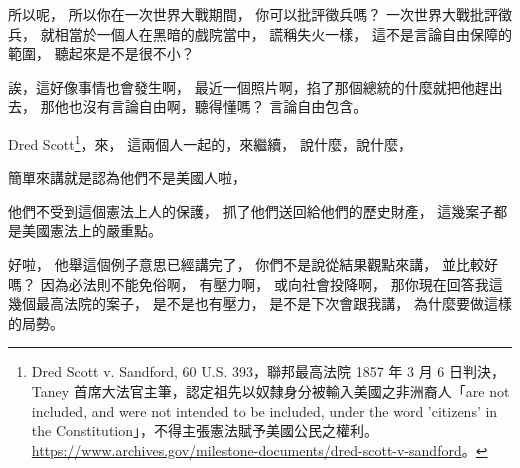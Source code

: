 \hypertarget{w06:cue:2427}{}所以呢，
\hypertarget{w06:cue:2428}{}所以你在一次世界大戰期間，
\hypertarget{w06:cue:2429}{}你可以批評徵兵嗎？
\hypertarget{w06:cue:2430}{}一次世界大戰批評徵兵，
\hypertarget{w06:cue:2431}{}就相當於一個人在黑暗的戲院當中，
\hypertarget{w06:cue:2432}{}謊稱失火一樣，
\hypertarget{w06:cue:2433}{}這不是言論自由保障的範圍，
\hypertarget{w06:cue:2434}{}聽起來是不是很不小？

\hypertarget{w06:cue:2435}{}誒，這好像事情也會發生啊，
\hypertarget{w06:cue:2436}{}最近一個照片啊，掐了那個總統的什麼就把他趕出去，
\hypertarget{w06:cue:2437}{}那他也沒有言論自由啊，聽得懂嗎？
\hypertarget{w06:cue:2438}{}言論自由包含。

\hypertarget{w06:cue:2439}{}Dred Scott\footnote{Dred Scott v. Sandford, 60 U.S. 393，聯邦最高法院 1857 年 3 月 6 日判決，Taney 首席大法官主筆，認定祖先以奴隸身分被輸入美國之非洲裔人「are not included, and were not intended to be included, under the word 'citizens' in the Constitution」，不得主張憲法賦予美國公民之權利。\url{https://www.archives.gov/milestone-documents/dred-scott-v-sandford}。}，來，
\hypertarget{w06:cue:2440}{}這兩個人一起的，來繼續，
\hypertarget{w06:cue:2441}{}說什麼，說什麼，

\hypertarget{w06:cue:2442}{}簡單來講就是認為他們不是美國人啦，

\hypertarget{w06:cue:2443}{}他們不受到這個憲法上人的保護，
\hypertarget{w06:cue:2444}{}抓了他們送回給他們的歷史財產，
\hypertarget{w06:cue:2445}{}這幾案子都是美國憲法上的嚴重點。

\hypertarget{w06:cue:2446}{}好啦，
\hypertarget{w06:cue:2447}{}他舉這個例子意思已經講完了，
\hypertarget{w06:cue:2448}{}你們不是說從結果觀點來講，
\hypertarget{w06:cue:2449}{}並比較好嗎？
\hypertarget{w06:cue:2450}{}因為必法則不能免俗啊，
\hypertarget{w06:cue:2451}{}有壓力啊，
\hypertarget{w06:cue:2452}{}或向社會投降啊，
\hypertarget{w06:cue:2453}{}那你現在回答我這幾個最高法院的案子，
\hypertarget{w06:cue:2454}{}是不是也有壓力，
\hypertarget{w06:cue:2455}{}是不是下次會跟我講，
\hypertarget{w06:cue:2456}{}為什麼要做這樣的局勢。

